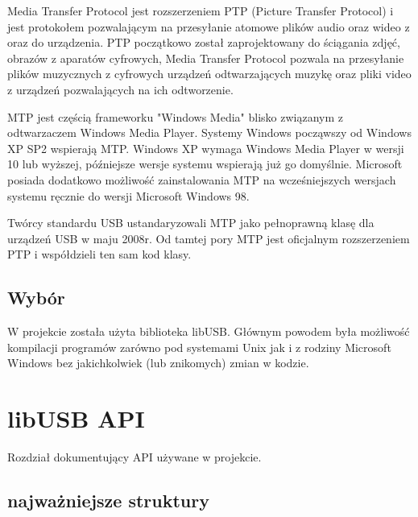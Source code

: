 \documentclass{BscUS}
\begin{document}
Media Transfer Protocol jest rozszerzeniem PTP (Picture Transfer Protocol) i jest protokołem pozwalającym na przesyłanie atomowe plików audio oraz wideo z oraz do urządzenia. PTP początkowo został zaprojektowany do ściągania zdjęć, obrazów z aparatów cyfrowych, Media Transfer Protocol pozwala na przesyłanie plików muzycznych z cyfrowych urządzeń odtwarzających muzykę oraz pliki video z urządzeń pozwalających na ich odtworzenie.

 

MTP jest częścią frameworku "Windows Media" blisko związanym z odtwarzaczem Windows Media Player. Systemy Windows począwszy od Windows XP SP2 wspierają MTP. Windows XP wymaga Windows Media Player w wersji 10 lub wyższej, późniejsze wersje systemu wspierają już go domyślnie. Microsoft posiada dodatkowo możliwość zainstalowania MTP na wcześniejszych wersjach systemu ręcznie do wersji Microsoft Windows 98.

Twórcy standardu USB ustandaryzowali MTP jako pełnoprawną klasę dla urządzeń USB w maju 2008r.
Od tamtej pory MTP jest oficjalnym rozszerzeniem PTP i współdzieli ten sam kod klasy. \cite{winusbDesc, micrDevAppUSBDev, micrAccUsbDev, micCommWithUsb}
\newline

\section{Wybór}
W projekcie została użyta biblioteka libUSB. Głównym powodem była możliwość kompilacji programów zarówno pod systemami Unix jak i z rodziny Microsoft Windows bez jakichkolwiek (lub znikomych) zmian w kodzie.

\chapter{libUSB API}
\label{libUsbChapter}
Rozdział dokumentujący API używane w projekcie. \cite{libusbDoc}
\section{najważniejsze struktury}
\end{document}

